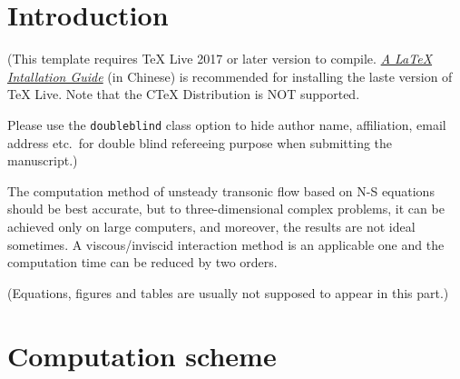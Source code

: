 \documentclass{cja}
\begin{document}

\maketitle


\section{Introduction}
\label{sec:introduction}

\begin{instructions}
  (This template requires TeX Live 2017 or later version to compile.
  \href{https://www.latexstudio.net/uploads/install-latex-guide-zh-cn.pdf}{\emph{A LaTeX Intallation Guide}} (in Chinese) is recommended for installing the laste version of TeX Live.
  Note that the CTeX Distribution is NOT supported.

    Please use the \texttt{doubleblind} class option to hide author name, affiliation, email address etc.\ for double blind refereeing purpose when submitting the manuscript.)
\end{instructions}

The computation method of unsteady transonic flow based on N-S equations should be best accurate, but to three-dimensional complex problems, it can be achieved only on large computers, and moreover, the results are not ideal sometimes\cite{van2000art}.
A viscous/inviscid interaction method is an applicable one and the computation time can be reduced by two orders.

\begin{instructions}
  (Equations, figures and tables are usually not supposed to appear in this part.)
\end{instructions}



\section{Computation scheme}
\label{sec:method}
\end{document}
